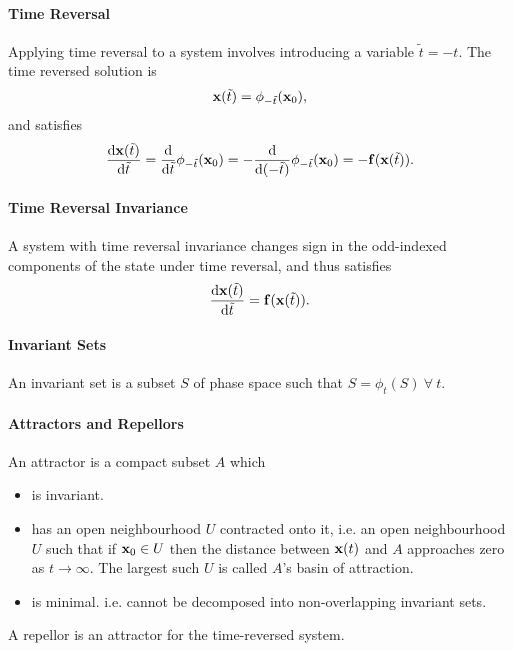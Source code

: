 \paragraph{Time Reversal}
Applying time reversal to a system involves introducing a variable $\tilde{t} = -t$. The time reversed solution is
\begin{align*}
	\vb{x}(\tilde{t}) = \phi_{-\tilde{t}}(\vb{x}_{0}),
\end{align*}
and satisfies
\begin{align*}
	\dv{\vb{x}(\tilde{t})}{\tilde{t}} = \dv{\tilde{t}}\phi_{-\tilde{t}}(\vb{x}_{0}) = -\dv{(-\tilde{t})}\phi_{-\tilde{t}}(\vb{x}_{0}) = -\vb{f}(\vb{x}(\tilde{t})).
\end{align*}

\paragraph{Time Reversal Invariance}
A system with time reversal invariance changes sign in the odd-indexed components of the state under time reversal, and thus satisfies
\begin{align*}
	\dv{\vb{x}(\tilde{t})}{\tilde{t}} = \vb{f}(\vb{x}(\tilde{t})).
\end{align*}

\paragraph{Invariant Sets}
An invariant set is a subset $S$ of phase space such that $S = \phi_{t}(S)\ \forall\ t$.

\paragraph{Attractors and Repellors}
An attractor is a compact subset $A$ which
\begin{itemize}
	\item is invariant.
	\item has an open neighbourhood $U$ contracted onto it, i.e. an open neighbourhood $U$ such that if $\vb{x}_{0}\in U$ then the distance between $\vb{x}(t)$ and $A$ approaches zero as $t\to\infty$. The largest such $U$ is called $A$'s basin of attraction.
	\item is minimal. i.e. cannot be decomposed into non-overlapping invariant sets.
\end{itemize}
A repellor is an attractor for the time-reversed system.

